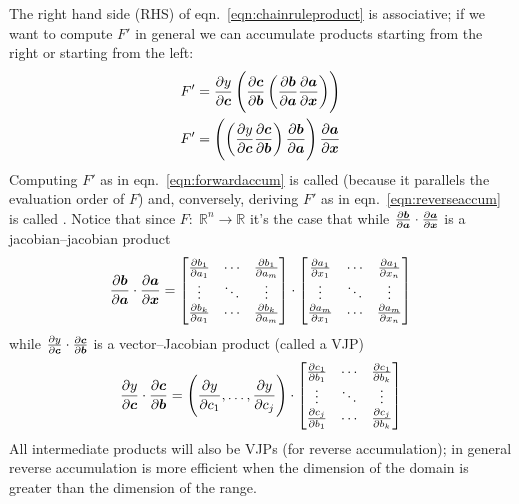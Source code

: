 The right hand side (RHS) of eqn.~\eqref{eqn:chainruleproduct} is associative; if we want to compute \(F'\) in general we can accumulate products starting from the right or starting from the left:
%
\begin{align}
    F' & = \pdv{y}{\bm{c}}
    \left( \pdv{\bm{c}}{\bm{b}}
    \left( \pdv{\bm{b}}{\bm{a}}
    \pdv{\bm{a}}{\bm{x}}\right)\right) \label{eqn:forwardaccum} \\
    F' & =  \left( \left( \pdv{y}{\bm{c}}
    \pdv{\bm{c}}{\bm{b}} \right)
    \pdv{\bm{b}}{\bm{a}} \right)
    \pdv{\bm{a}}{\bm{x}} \label{eqn:reverseaccum}
\end{align}
%
Computing \(F'\) as in eqn.~\eqref{eqn:forwardaccum} is called  (because it parallels the evaluation order of \(F\)) and, conversely, deriving \(F'\) as in eqn.~\eqref{eqn:reverseaccum} is called .
%
Notice that since \(F\colon\; \mathbb{R}^n  \rightarrow \mathbb{R}\) it's the case that while \(\pdv{\bm{b}}{\bm{a}}\cdot \pdv{\bm{a}}{\bm{x}}\) is a jacobian--jacobian product
\begin{equation}
    \pdv{\bm{b}}{\bm{a}}\cdot
    \pdv{\bm{a}}{\bm{x}} =         \begin{bmatrix}
        \pdv{b_1}{a_1} & \cdots & \pdv{b_1}{a_m} \\
        \vdots         & \ddots & \vdots         \\
        \pdv{b_k}{a_1} & \cdots & \pdv{b_k}{a_m}
    \end{bmatrix}
    \cdot
    \begin{bmatrix}
        \pdv{a_1}{x_1} & \cdots & \pdv{a_1}{x_n} \\
        \vdots         & \ddots & \vdots         \\
        \pdv{a_m}{x_1} & \cdots & \pdv{a_m}{x_n}
    \end{bmatrix}
\end{equation}
%
while \(\pdv{y}{\bm{c}}\cdot \pdv{\bm{c}}{\bm{b}}\) is a vector--Jacobian product (called a VJP)
%
\begin{equation}
    \pdv{y}{\bm{c}}\cdot
    \pdv{\bm{c}}{\bm{b}} = \left( \pdv{y}{c_1}, \dots,  \pdv{y}{c_j} \right)
    \cdot
    \begin{bmatrix}
        \pdv{c_1}{b_1} & \cdots & \pdv{c_1}{b_k} \\
        \vdots         & \ddots & \vdots         \\
        \pdv{c_j}{b_1} & \cdots & \pdv{c_j}{b_k}
    \end{bmatrix}
\end{equation}
%
All intermediate products will also be VJPs (for reverse accumulation); in general reverse accumulation is more efficient when the dimension of the domain is greater than the dimension of the range.

